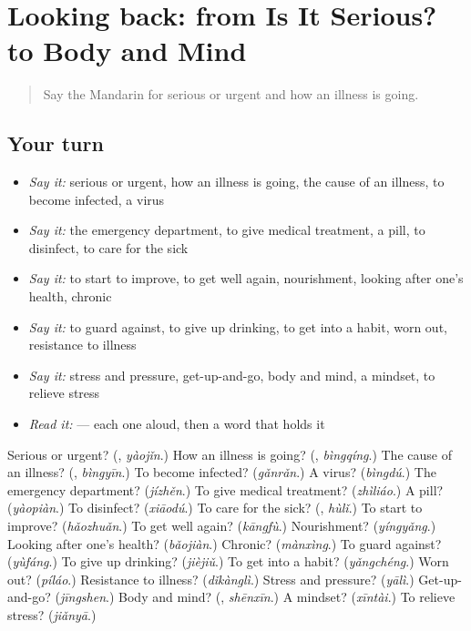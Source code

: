 \section[(dialogue)]{Looking back: from Is It Serious? to Body and Mind}

\label{lesson:ZH-R485-review-481-485}



\begin{quote}
Say the Mandarin for serious or urgent and how an illness is going.
\end{quote}

\subsection*{Your turn}
\begin{itemize}
\raggedright
  \item \emph{Say it:} serious or urgent, how an illness is going, the cause of an illness, to become infected, a virus
  \item \emph{Say it:} the emergency department, to give medical treatment, a pill, to disinfect, to care for the sick
  \item \emph{Say it:} to start to improve, to get well again, nourishment, looking after one's health, chronic
  \item \emph{Say it:} to guard against, to give up drinking, to get into a habit, worn out, resistance to illness
  \item \emph{Say it:} stress and pressure, get-up-and-go, body and mind, a mindset, to relieve stress
  \item \emph{Read it:}  — each one aloud, then a word that holds it
\end{itemize}

\begin{tcolorbox}[breakable,colback=teal!4,colframe=teal!35!black,title={Before you move on}]
Serious or urgent? (\textbf{}, \emph{yàojǐn}.) How an illness is going? (\textbf{}, \emph{bìngqíng}.) The cause of an illness? (\textbf{}, \emph{bìngyīn}.) To become infected? (\emph{gǎnrǎn}.) A virus? (\emph{bìngdú}.) The emergency department? (\emph{jízhěn}.) To give medical treatment? (\emph{zhìliáo}.) A pill? (\emph{yàopiàn}.) To disinfect? (\emph{xiāodú}.) To care for the sick? (\textbf{}, \emph{hùlǐ}.) To start to improve? (\emph{hǎozhuǎn}.) To get well again? (\emph{kāngfù}.) Nourishment? (\emph{yíngyǎng}.) Looking after one's health? (\emph{bǎojiàn}.) Chronic? (\emph{mànxìng}.) To guard against? (\emph{yùfáng}.) To give up drinking? (\emph{jièjiǔ}.) To get into a habit? (\emph{yǎngchéng}.) Worn out? (\emph{píláo}.) Resistance to illness? (\emph{dǐkànglì}.) Stress and pressure? (\emph{yālì}.) Get-up-and-go? (\emph{jīngshen}.) Body and mind? (\textbf{}, \emph{shēnxīn}.) A mindset? (\emph{xīntài}.) To relieve stress? (\emph{jiǎnyā}.)
\end{tcolorbox}
